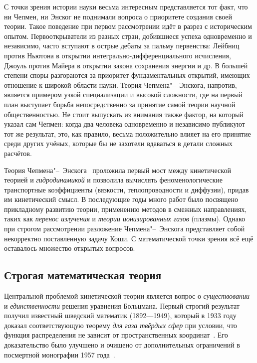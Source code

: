 \documentclass[a4paper, 12pt, oneside]{article} %
\begin{document}
С точки зрения истории науки весьма интересным представляется тот факт,
что ни Чепмен, ни Энског не поднимали вопроса о приоритете создания
своей теории. Такое поведение при первом рассмотрении идёт в разрез с
историческим опытом. Первооткрыватели из разных стран, добившиеся успеха
одновременно и независимо, часто вступают в острые дебаты за пальму
первенства: Лейбниц против Ньютона в открытии
интегрально-дифференциального исчисления, Джоуль против Майера в
открытии закона сохранения энергии и др. В большей степени споры
разгораются за приоритет фундаментальных открытий, имеющих отношение к
широкой области науки. Теория Чепмена"--~Энскога, напротив, является
примером узкой специализации и высокой сложности, где на первый план
выступает борьба непосредственно за принятие самой теории научной
общественностью. Не стоит выпускать из внимания также фактор, на который
указал сам Чепмен: когда два человека одновременно и независимо
публикуют тот же результат, это, как правило, весьма положительно влияет
на его принятие среди других учёных, которые бы не захотели вдаваться в
детали сложных расчётов.

Теория Чепмена"--~Энскога~\cite{chapman1960theory} проложила первый мост
между кинетической теорией и \emph{гидродинамикой} и позволила вычислять
феноменологические транспортные коэффициенты (вязкости, теплопроводности
и диффузии), придав им кинетический смысл. В последующие годы много
работ было посвящено прикладному развитию теории, применению методов в
смежных направлениях, таких как \emph{перенос излучения} и \emph{теории
ионизированных газов} (плазмы). Однако при строгом рассмотрении
разложение Чепмена"--~Энскога представляет собой некорректно
поставленную задачу Коши. С математической точки зрения всё ещё
оставалось множество открытых вопросов.

\subsection{Строгая математическая теория}

Центральной проблемой кинетической теории является вопрос о
\emph{существовании} и \emph{единственности} решения уравнения
Больцмана. Первый строгий результат получил известный шведский математик
 (1892---1949), который в 1933 году доказал
соответствующую теорему \emph{для газа твёрдых сфер} при условии, что функция
распределения не зависит от пространственных
координат~\cite{carleman1933theorie}. Его доказательство было улучшено и
очищено от дополнительных ограничений в посмертной монографии 1957
года~\cite{carleman1960problems}.
\end{document}
